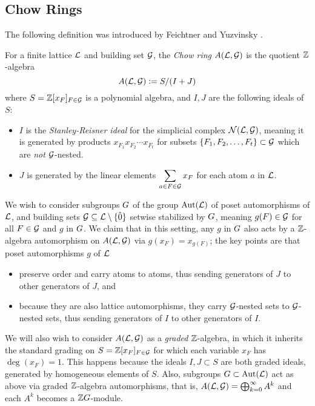 \subsection{Chow Rings}
\label{Chow-ring-section}
The following definition was introduced by
Feichtner and Yuzvinsky \cite{FY}.


\begin{defn} 
\label{Chow-ring-definition}
For a finite lattice $\mathcal{L}$ and building set $\mathcal{G}$, 
the \emph{Chow ring} $A(\mathcal{L}, \mathcal{G})$ is the quotient $\mathbb{Z}$-algebra 
    $$
    A(\mathcal{L}, \mathcal{G}) := S/(I+J)
    $$
    where $S=\mathbb{Z}[x_F]_{F \in \mathcal{G}}$ is a polynomial algebra, and $I,J$ are the following ideals of $S$:
    \begin{itemize}
      \item $I$ is the {\it Stanley-Reisner ideal} for the simplicial complex $\mathcal{N}(\mathcal{L},\mathcal{G})$, meaning it is
      generated by products $x_{F_1} x_{F_2} \cdots x_{F_t}$ for subsets  $\{F_1, F_2, \ldots, F_t\} \subset \mathcal{G}$ which are {\it not} $\mathcal{G}$-nested.
    \item $J$ is generated by the linear elements
$\displaystyle\sum_{a \in F \in \mathcal{G}} x_F$ for each atom $a$ 
in $\mathcal{L}$.
    \end{itemize}
\end{defn}

We wish to consider subgroups $G$ of the group $\operatorname{\mathrm{Aut}}(\mathcal{L})$ of poset automorphisms of $\mathcal{L}$, and building sets $\mathcal{G} \subseteq \mathcal{L} \setminus \{\hat{0}\}$ setwise stabilized by $G$, meaning $g(F) \in \mathcal{G}$ for all $F \in \mathcal{G}$ and $g$ in $G$.  We claim that in this setting, any $g$ in $G$ also acts by a $\mathbb{Z}$-algebra automorphism on $A(\mathcal{L},\mathcal{G})$ via $g(x_F)=x_{g(F)}$;  the key points are that poset automorphisms $g$ of $\mathcal{L}$
\begin{itemize}
\item preserve order and carry atoms to atoms, thus sending generators of $J$ to other generators of $J$, and 
\item because they
are also lattice automorphisms, they carry $\mathcal{G}$-nested sets to $\mathcal{G}$-nested sets, thus sending generators of $I$ to other generators of $I$.
\end{itemize}

We will also wish to consider $A(\mathcal{L},\mathcal{G})$ as a {\it graded} $\mathbb{Z}$-algebra, in which it inherits the standard grading on
$S=\mathbb{Z}[x_F]_{F \in \mathcal{G}}$ for which each variable $x_F$ has
$\deg(x_F)=1$.  This happens because the ideals $I,J \subset S$ are both graded ideals, generated by homogeneous elements of $S$. Also, subgroups $G \subset \operatorname{\mathrm{Aut}}(\mathcal{L})$ act as above via graded $\mathbb{Z}$-algebra automorphisms, that is, 
$A(\mathcal{L},\mathcal{G})=\bigoplus_{k=0}^\infty A^k$
and each $A^k$ becomes a $\mathbb{Z} G$-module.


